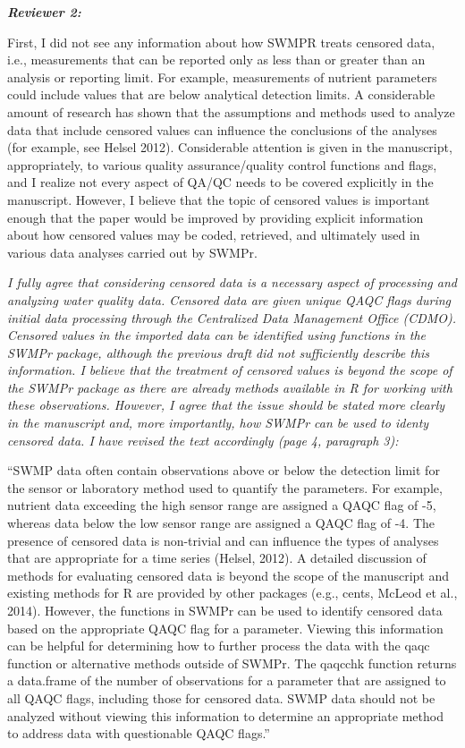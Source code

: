 \documentclass[letterpaper,12pt]{article}\usepackage[]{graphicx}\usepackage[]{color}
\newcommand{\Bigtxt}[1]{\textbf{\textit{#1}}}
\begin{document}
\Bigtxt{Reviewer 2:}

First, I did not see any information about how SWMPR treats censored data, i.e., measurements that can be reported only as less than or greater than an analysis or reporting limit. For example, measurements of nutrient parameters could include values that are below analytical detection limits. A considerable amount of research has shown that the assumptions and methods used to analyze data that include censored values can influence the conclusions of the analyses (for example, see Helsel 2012). Considerable attention is given in the manuscript, appropriately, to various quality assurance/quality control functions and flags, and I realize not every aspect of QA/QC needs to be covered explicitly in the manuscript. However, I believe that the topic of censored values is important enough that the paper would be improved by providing explicit information about how censored values may be coded, retrieved, and ultimately used in various data analyses carried out by SWMPr.

{\it I fully agree that considering censored data is a necessary aspect of processing and analyzing water quality data.  Censored data are given unique QAQC flags during initial data processing through the Centralized Data Management Office (CDMO).  Censored values in the imported data can be identified using functions in the SWMPr package, although the previous draft did not sufficiently describe this information.  I believe that the treatment of censored values is beyond the scope of the SWMPr package as there are already methods available in R for working with these observations.  However, I agree that the issue should be stated more clearly in the manuscript and, more importantly, how SWMPr can be used to identy censored data.  I have revised the text accordingly (page 4, paragraph 3): 

``SWMP data often contain observations above or below the detection limit for the sensor or laboratory method used to quantify the parameters.  For example, nutrient data exceeding the high sensor range are assigned a QAQC flag of -5, whereas data below the low sensor range are assigned a QAQC flag of -4.  The presence of censored data is non-trivial and can influence the types of analyses that are appropriate for a time series (Helsel, 2012).  A detailed discussion of methods for evaluating censored data is beyond the scope of the manuscript and existing methods for R are provided by other packages (e.g., cents, McLeod et al., 2014).  However, the functions in SWMPr can be used to identify censored data based on the appropriate QAQC flag for a parameter.  Viewing this information can be helpful for determining how to further process the data with the qaqc function or alternative methods outside of SWMPr.  The qaqcchk function returns a data.frame of the number of observations for a parameter that are assigned to all QAQC flags, including those for censored data.  SWMP data should not be analyzed without viewing this information to determine an appropriate method to address data with questionable QAQC flags.''
}
\end{document}

